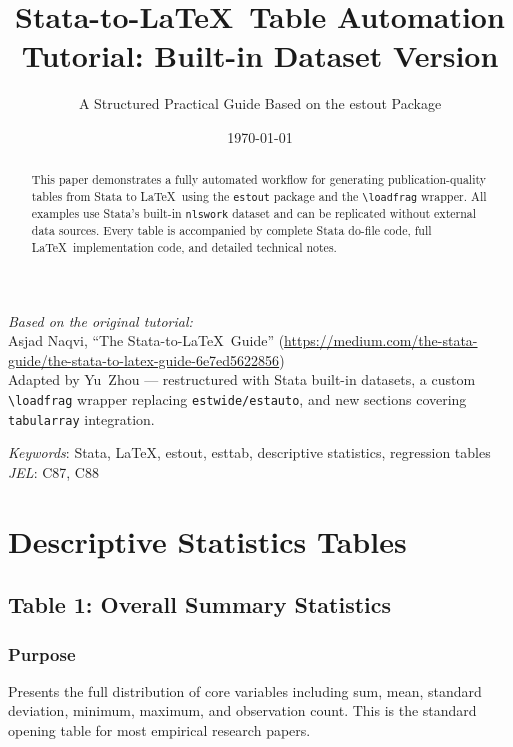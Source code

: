 \documentclass[11pt]{article}
\title{Stata-to-\LaTeX\ Table Automation Tutorial: Built-in Dataset Version}
\author{A Structured Practical Guide Based on the estout Package}
\date{\today}
\numberwithin{table}{section}
\begin{document}
\maketitle

\vspace{-2ex}
\begin{flushleft}
\small
\textit{Based on the original tutorial:}\\
Asjad Naqvi, ``The Stata-to-\LaTeX\ Guide'' (\url{https://medium.com/the-stata-guide/the-stata-to-latex-guide-6e7ed5622856})\\
Adapted by Yu~Zhou --- restructured with Stata built-in datasets, a custom
\texttt{\textbackslash loadfrag} wrapper replacing \texttt{estwide/estauto},
and new sections covering \texttt{tabularray} integration.
\end{flushleft}

\begin{abstract}
This paper demonstrates a fully automated workflow for generating publication-quality tables from Stata to \LaTeX\ using the \texttt{estout} package and the \texttt{\textbackslash loadfrag} wrapper. All examples use Stata's built-in \texttt{nlswork} dataset and can be replicated without external data sources. Every table is accompanied by complete Stata do-file code, full \LaTeX\ implementation code, and detailed technical notes.
\end{abstract}

\vspace{4ex}
\small{\textit{Keywords}: Stata, \LaTeX, estout, esttab, descriptive statistics, regression tables}
\vspace{2ex}
\small{\textit{JEL}: C87, C88}

\newpage
\tableofcontents
\newpage
\listoftables
\newpage


\section{Descriptive Statistics Tables}

\subsection{Table 1: Overall Summary Statistics}
\subsubsection{Purpose}
Presents the full distribution of core variables including sum, mean, standard deviation, minimum, maximum, and observation count. This is the standard opening table for most empirical research papers.
\end{document}
